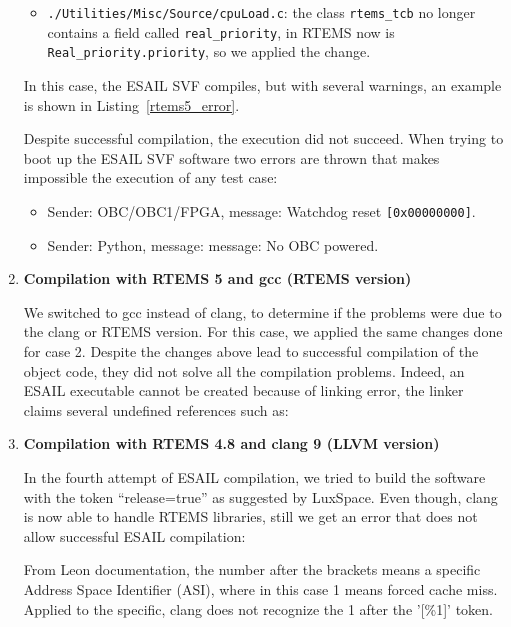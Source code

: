 \begin{enumerate}
\begin{itemize}
		\item \texttt{./Utilities/Misc/Source/cpuLoad.c}: the class \texttt{rtems\_tcb} no longer contains a field called \texttt{real\_priority}, in RTEMS now is \texttt{Real\_priority.priority}, so we applied the change.
	\end{itemize}

	In this case, the ESAIL SVF compiles, but with several warnings, an example is shown in Listing~\ref{rtems5_error}.

	

	Despite successful compilation, the execution did not succeed. When trying to boot up the ESAIL SVF software two errors are thrown that makes impossible the execution of any test case:
	\begin{itemize}
		\item Sender: OBC/OBC1/FPGA, message: Watchdog reset \texttt{[0x00000000]}.
		\item Sender: Python, message: message: No OBC powered.
	\end{itemize}

	\item \textbf{Compilation with RTEMS 5 and gcc (RTEMS version)}

	We switched to gcc instead of clang, to determine if the problems were due to the clang or RTEMS version. For this case, we applied the same changes done for case 2.
	Despite the changes above lead to successful compilation of the object code, they did not solve all the compilation problems. Indeed, an ESAIL executable cannot be created because of linking error, the linker claims several undefined references such as:

	

	\item \textbf{Compilation with RTEMS 4.8 and clang 9 (LLVM version)}
	
	In the fourth attempt of ESAIL compilation, we tried to build the software with the token “release=true” as suggested by LuxSpace. Even though, clang is now able to handle RTEMS libraries, still we get an error that does not allow successful ESAIL compilation:

	

	From Leon documentation, the number after the brackets means a specific Address Space Identifier (ASI), where in this case 1 means forced cache miss. Applied to the specific, clang does not recognize the 1 after the '[\%1]' token.

\end{enumerate}


